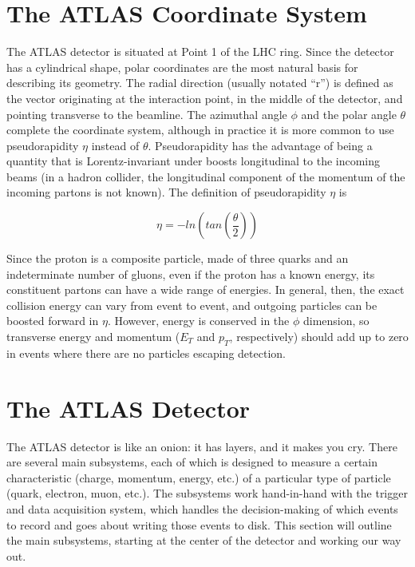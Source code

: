 \section{The ATLAS Coordinate System}
The ATLAS detector is situated at Point 1 of the LHC ring.  Since the detector has a cylindrical shape, polar coordinates are the most natural basis for describing its geometry.  The radial direction (usually notated ``r'') is defined as the vector originating at the interaction point, in the middle of the detector, and pointing transverse to the beamline.  The azimuthal angle $\phi$ and the polar angle $\theta$ complete the coordinate system, although in practice it is more common to use pseudorapidity $\eta$ instead of $\theta$.  Pseudorapidity has the advantage of being a quantity that is Lorentz-invariant under boosts longitudinal to the incoming beams (in a hadron collider, the longitudinal component of the momentum of the incoming partons is not known).  The definition of pseudorapidity $\eta$ is

\begin{equation}
\eta = -ln(tan( \frac{\theta}{2} ))
\end{equation}

Since the proton is a composite particle, made of three quarks and an indeterminate number of gluons, even if the proton has a known energy, its constituent partons can have a wide range of energies.  In general, then, the exact collision energy can vary from event to event, and outgoing particles can be boosted forward in $\eta$.  However, energy is conserved in the $\phi$ dimension, so transverse energy and momentum ($E_T$ and $p_T$, respectively) should add up to zero in events where there are no particles escaping detection.

\section{The ATLAS Detector}
The ATLAS detector is like an onion: it has layers, and it makes you cry.  There are several main subsystems, each of which is designed to measure a certain characteristic (charge, momentum, energy, etc.) of a particular type of particle (quark, electron, muon, etc.).  The subsystems work hand-in-hand with the trigger and data acquisition system, which handles the decision-making of which events to record and goes about writing those events to disk.  This section will outline the main subsystems, starting at the center of the detector and working our way out.

